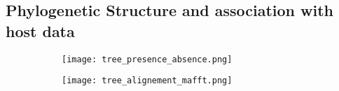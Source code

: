 \subsection*{Phylogenetic Structure and association with host data}
\graphicspath{{images/phylogeneticStructureHostData/}}


\begin{figure}[h]	%
    \centering
    \begin{subfigure}[b]{0.8\textwidth}
        \centering
        \texttt{[image: tree\_presence\_absence.png]}
        \caption{\scriptsize{}}
        \label{fig:tree_genes}
    \end{subfigure}
    \begin{subfigure}[b]{0.8\textwidth}
        \centering
        \texttt{[image: tree\_alignement\_mafft.png]}
        \caption{}
        \label{fig:tree_align}
    \end{subfigure}
       \caption{}
       \label{fig:trees}
\end{figure}

